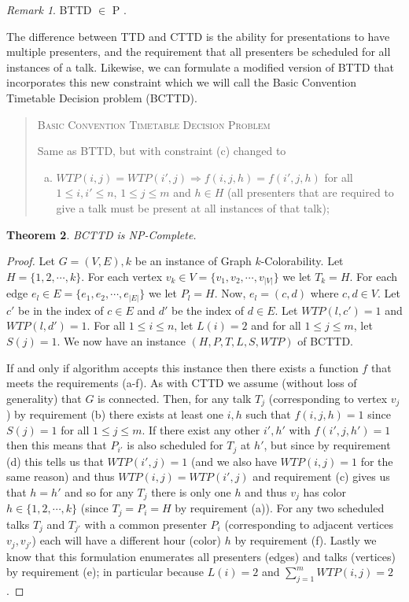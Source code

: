 \documentclass[]{article}
\newtheorem{thm}{Theorem}[section]
\theoremstyle{definition}
\theoremstyle{remark}
\newtheorem{rem}[thm]{Remark}
\numberwithin{equation}{section}
\begin{document}
\begin{rem}
BTTD $\in$ P \cite{lovelace2010}.
\end{rem}
The difference between TTD and CTTD is the ability for presentations to have multiple presenters, and the requirement that all presenters be scheduled for all instances of a talk. Likewise, we can formulate a modified version of BTTD that incorporates this new constraint which we will call the Basic Convention Timetable Decision problem (BCTTD). 
\begin{quote}
	\textsc{Basic Convention Timetable Decision Problem}
	
	Same as BTTD, but with constraint (c) changed to
	\begin{enumerate}[(c)]
		\item $WTP(i,j) = WTP(i',j) \Rightarrow f(i,j,h)=f(i',j,h)$ for all $1 \le i,i' \le n$, $1 \le j \le m$ and $h \in H$ (all presenters that are required to give a talk must be present at all instances of that talk);
	\end{enumerate}
\end{quote}
\begin{thm}
BCTTD is NP-Complete.
\end{thm}
\begin{proof}\label{bcttd_np}
Let $G=(V,E),k$ be an instance of Graph $k$-Colorability. Let $H=\{1, 2, \cdots, k\}$. For each vertex $v_k \in V=\{v_1, v_2, \cdots, v_{|V|}\}$ we let $T_k = H$. For each edge $e_l \in E=\{e_1, e_2, \cdots, e_{|E|}\}$ we let $P_l = H$. Now, $e_l = (c,d)$ where $c,d \in V$. Let $c'$ be in the index of $c \in E$ and $d'$ be the index of $d \in E$. Let $WTP(l,c')=1$ and $WTP(l,d')=1$. For all $1 \le i \le n$, let $L(i)=2$ and for all $1 \le j \le m$, let $S(j)=1$. We now have an instance $(H,P,T,L,S,WTP)$ of BCTTD.

If and only if algorithm accepts this instance then there exists a function $f$ that meets the requirements (a-f). As with CTTD we assume (without loss of generality) that $G$ is connected. Then, for any talk $T_j$ (corresponding to vertex $v_j$) by requirement (b) there exists at least one $i, h$ such that $f(i,j,h) = 1$ since $S(j)=1$ for all $1 \le j \le m$. If there exist any other $i',h'$ with $f(i',j,h')=1$ then this means that $P_{i'}$ is also scheduled for $T_j$ at $h'$, but since by requirement (d) this tells us that $WTP(i',j)=1$ (and we also have $WTP(i,j)=1$ for the same reason) and thus $WTP(i,j)=WTP(i',j)$ and requirement (c) gives us that $h=h'$ and so for any $T_j$ there is only one $h$ and thus $v_j$ has color $h \in \{1,2,\cdots,k\}$ (since $T_j=P_i=H$ by requirement (a)). For any two scheduled talks $T_j$ and $T_{j'}$ with a common presenter $P_i$ (corresponding to adjacent vertices $v_j, v_{j'}$) each will have a different hour (color) $h$ by requirement (f). Lastly we know that this formulation enumerates all presenters (edges) and talks (vertices) by requirement (e); in particular because $L(i) = 2$ and $\sum_{j=1}^{m} WTP(i,j) = 2$.
\end{proof}
\end{document}
